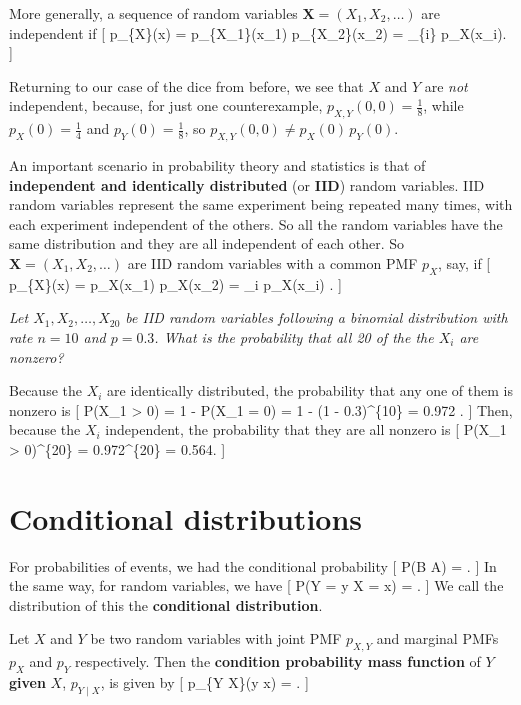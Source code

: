 \documentclass[
  letterpaper,
]{report}
\theoremstyle{definition}
\theoremstyle{definition}
\theoremstyle{remark}
\begin{document}
More generally, a sequence of random variables
\(\mathbf X = (X_1, X_2, \dots)\) are independent if {[}
p\_\{\mathbf X\}(\mathbf x) = p\_\{X\_1\}(x\_1) \times p\_\{X\_2\}(x\_2)
\times \cdots = \prod\_\{i\} p\_X(x\_i). {]}

Returning to our case of the dice from before, we see that \(X\) and
\(Y\) are \emph{not} independent, because, for just one counterexample,
\(p_{X,Y}(0,0) = \frac18\), while \(p_X(0) = \frac14\) and
\(p_Y(0) = \frac18\), so \(p_{X,Y}(0,0) \neq p_X(0) \, p_Y(0)\).

An important scenario in probability theory and statistics is that of
\textbf{independent and identically distributed} (or \textbf{IID})
random variables. IID random variables represent the same experiment
being repeated many times, with each experiment independent of the
others. So all the random variables have the same distribution and they
are all independent of each other. So \(\mathbf X = (X_1, X_2, \dots )\)
are IID random variables with a common PMF \(p_X\), say, if {[}
p\_\{\mathbf X\}(\mathbf x) = p\_X(x\_1) \times p\_X(x\_2)
\times \cdots = \prod\_i p\_X(x\_i) . {]}

\emph{Let \(X_1, X_2, \dots, X_{20}\) be IID random variables following
a binomial distribution with rate \(n = 10\) and \(p = 0.3\). What is
the probability that all 20 of the the \(X_i\) are nonzero?}

Because the \(X_i\) are identically distributed, the probability that
any one of them is nonzero is {[} \mathbb P(X\_1 \textgreater{} 0) = 1 -
\mathbb P(X\_1 = 0) = 1 - (1 - 0.3)\^{}\{10\} = 0.972 . {]} Then,
because the \(X_i\) independent, the probability that they are all
nonzero is {[} \mathbb P(X\_1 \textgreater{} 0)\^{}\{20\} =
0.972\^{}\{20\} = 0.564. {]}

\hypertarget{cond-rv}{%
\section{Conditional distributions}\label{cond-rv}}

For probabilities of events, we had the conditional probability {[}
\mathbb P(B \mid A) =  . {]} In
the same way, for random variables, we have {[} \mathbb P(Y = y \mid X =
x) =  . {]}
We call the distribution of this the \textbf{conditional distribution}.

Let \(X\) and \(Y\) be two random variables with joint PMF \(p_{X,Y}\)
and marginal PMFs \(p_X\) and \(p_Y\) respectively. Then the
\textbf{condition probability mass function} of \(Y\) \textbf{given}
\(X\), \(p_{Y \mid X}\), is given by {[} p\_\{Y \mid X\}(y \mid x) =
 . {]}
\end{document}
